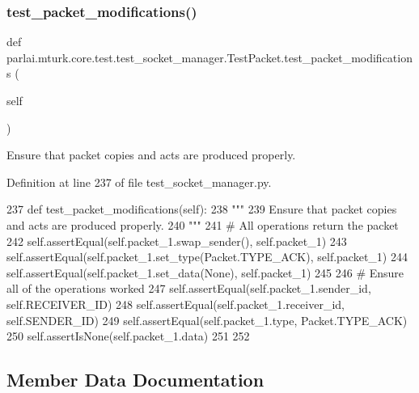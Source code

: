 \subsubsection{\texorpdfstring{test\+\_\+packet\+\_\+modifications()}{test\_packet\_modifications()}}
{\footnotesize\ttfamily def parlai.\+mturk.\+core.\+test.\+test\+\_\+socket\+\_\+manager.\+Test\+Packet.\+test\+\_\+packet\+\_\+modifications (\begin{DoxyParamCaption}\item[{}]{self }\end{DoxyParamCaption})}

\begin{DoxyVerb}Ensure that packet copies and acts are produced properly.
\end{DoxyVerb}
 

Definition at line 237 of file test\+\_\+socket\+\_\+manager.\+py.


\begin{DoxyCode}
237     \textcolor{keyword}{def }test\_packet\_modifications(self):
238         \textcolor{stringliteral}{"""}
239 \textcolor{stringliteral}{        Ensure that packet copies and acts are produced properly.}
240 \textcolor{stringliteral}{        """}
241         \textcolor{comment}{# All operations return the packet}
242         self.assertEqual(self.packet\_1.swap\_sender(), self.packet\_1)
243         self.assertEqual(self.packet\_1.set\_type(Packet.TYPE\_ACK), self.packet\_1)
244         self.assertEqual(self.packet\_1.set\_data(\textcolor{keywordtype}{None}), self.packet\_1)
245 
246         \textcolor{comment}{# Ensure all of the operations worked}
247         self.assertEqual(self.packet\_1.sender\_id, self.RECEIVER\_ID)
248         self.assertEqual(self.packet\_1.receiver\_id, self.SENDER\_ID)
249         self.assertEqual(self.packet\_1.type, Packet.TYPE\_ACK)
250         self.assertIsNone(self.packet\_1.data)
251 
252 
\end{DoxyCode}


\subsection{Member Data Documentation}
\mbox{\label{classparlai_1_1mturk_1_1core_1_1test_1_1test__socket__manager_1_1TestPacket_a8128dd7252762d1f74e0902606351428}} 
